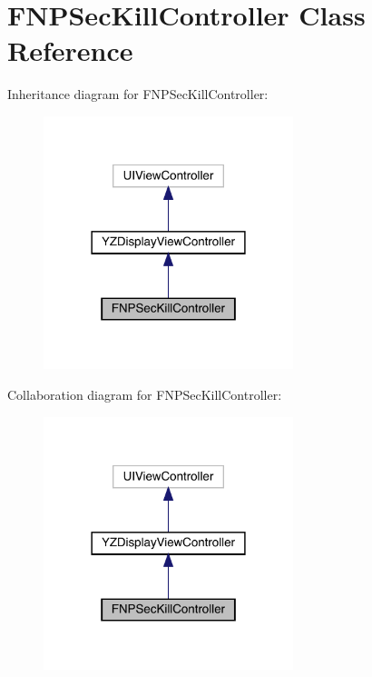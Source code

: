 \hypertarget{interface_f_n_p_sec_kill_controller}{}\section{F\+N\+P\+Sec\+Kill\+Controller Class Reference}
\label{interface_f_n_p_sec_kill_controller}


Inheritance diagram for F\+N\+P\+Sec\+Kill\+Controller\+:\nopagebreak
\begin{figure}[H]
\begin{center}
\leavevmode
\includegraphics[width=206pt]{interface_f_n_p_sec_kill_controller__inherit__graph}
\end{center}
\end{figure}


Collaboration diagram for F\+N\+P\+Sec\+Kill\+Controller\+:\nopagebreak
\begin{figure}[H]
\begin{center}
\leavevmode
\includegraphics[width=206pt]{interface_f_n_p_sec_kill_controller__coll__graph}
\end{center}
\end{figure}

